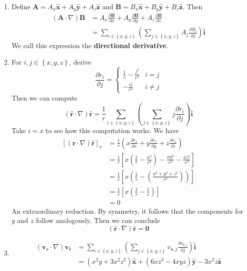 \documentclass[a4paper]{article}
\begin{document}
\begin{enumerate}[label=(\alph*)]
	\item Define \( \pmb{A} = A_{x}\pmb{\hat{x}} + A_{y}\pmb{\hat{y}} + A_{z}\pmb{\hat{z}} \) and \( \pmb{B} = B_{x}\pmb{\hat{x}} + B_{y}\pmb{\hat{y}} + B_{z}\pmb{\hat{z}} \). Then
	\begin{align*}
		\!\left( \pmb{A} \cdot \nabla \right)\pmb{B} & = A_{x}\frac{\partial \pmb{B}}{\partial x} + A_{y}\frac{\partial \pmb{B}}{\partial y} + A_{z}\frac{\partial \pmb{B}}{\partial z} \\
							     & = \sum_{i \in \!\left\{ x,y,z \right\}} \!\left( \sum_{j \in \!\left\{ x,y,z \right\}} A_{j}\frac{\partial B_{i}}{\partial j} \right)\pmb{\hat{i}}
	\end{align*}
	We call this expression the \textbf{directional derivative}.
	\item For \( i,j \in \!\left\{ x,y,z \right\} \), derive
	\[
		\frac{\partial r_{i}}{\partial j} = \begin{cases}
			\displaystyle{\frac{1}{r} - \frac{j^{2}}{r^{3}}} & i = j \\
			\displaystyle{-\frac{ij}{r^{3}}} & i \neq j
		\end{cases}
	\]
	Then we can compute
	\[
		\!\left( \pmb{\hat{r}} \cdot \nabla \right)\pmb{\hat{r}} = \frac{1}{r}\sum_{i \in \!\left\{ x,y,z \right\}}\!\left( \sum_{j \in \!\left\{ x,y,z \right\}} j \frac{\partial r_{i}}{\partial j} \right)\pmb{\hat{i}}
	\]
	Take \( i = x \) to see how this computation works. We have
	\begin{align*}
		\!\left[ \!\left( \pmb{\hat{r}} \cdot \nabla \right)\pmb{\hat{r}} \right]_{x} & = \frac{1}{r}\!\left( x \frac{\partial r_{x}}{\partial x} + y \frac{\partial r_{x}}{\partial y} + z \frac{\partial r_{x}}{\partial z} \right) \\
		& = \frac{1}{r}\!\left[ x\!\left( \frac{1}{r} - \frac{x^{2}}{r^{3}} \right) - \frac{xy^{2}}{r^{3}} - \frac{xz^{2}}{r^{3}} \right] \\ 
		& = \frac{1}{r}\!\left[ x \!\left( \frac{1}{r} - \!\left( \frac{x^{2} + y^{2} + z^{2}}{r^{3}} \right) \right) \right] \\
		& = \frac{1}{r}\!\left[ x \!\left( \frac{1}{r} - \frac{1}{r} \right) \right] \\
		& = 0 
	\end{align*}
	An extraordinary reduction. By symmetry, it follows that the components for \( y \) and \( z \) follow analogously. Then we can conclude
	\[
		\!\left( \pmb{\hat{r}} \cdot \nabla \right)\pmb{\hat{r}} = \pmb{0} 
	\]
	\item \begin{align*}
		\!\left( \pmb{v}_{a} \cdot \nabla \right)\pmb{v}_{b} & = \sum_{i \in \!\left\{ x,y,z \right\}} \!\left( \sum_{j \in \!\left\{ x,y,z \right\}} v_{a,j}\frac{\partial v_{b,i}}{\partial j} \right)\pmb{\hat{i}} \\
		 & = \!\left( x^{2}y + 3x^{2}z^{2} \right)\pmb{\hat{x}} + \!\left( 6xz^{3} - 4xyz \right)\pmb{\hat{y}} - 3x^{2}z \pmb{\hat{z}}
	\end{align*}
\end{enumerate}
\end{document}
